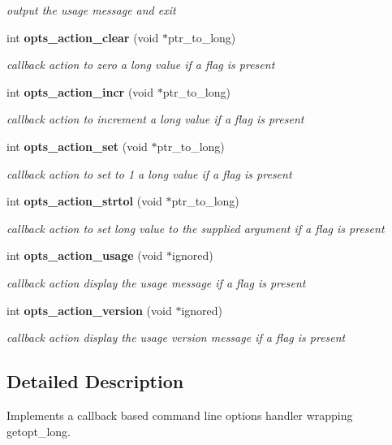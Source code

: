 \begin{CompactItemize}
\begin{CompactList}\small\item\em output the usage message and exit\item\end{CompactList}\item 
int {\bf opts\_\-action\_\-clear} (void $\ast$ptr\_\-to\_\-long)
\begin{CompactList}\small\item\em callback action to zero a long value if a flag is present\item\end{CompactList}\item 
int {\bf opts\_\-action\_\-incr} (void $\ast$ptr\_\-to\_\-long)
\begin{CompactList}\small\item\em callback action to increment a long value if a flag is present\item\end{CompactList}\item 
int {\bf opts\_\-action\_\-set} (void $\ast$ptr\_\-to\_\-long)
\begin{CompactList}\small\item\em callback action to set to 1 a long value if a flag is present\item\end{CompactList}\item 
int {\bf opts\_\-action\_\-strtol} (void $\ast$ptr\_\-to\_\-long)
\begin{CompactList}\small\item\em callback action to set long value to the supplied argument if a flag is present\item\end{CompactList}\item 
int {\bf opts\_\-action\_\-usage} (void $\ast$ignored)
\begin{CompactList}\small\item\em callback action display the usage message if a flag is present\item\end{CompactList}\item 
int {\bf opts\_\-action\_\-version} (void $\ast$ignored)
\begin{CompactList}\small\item\em callback action display the usage version message if a flag is present\item\end{CompactList}\end{CompactItemize}


\subsection{Detailed Description}
Implements a callback based command line options handler wrapping getopt\_\-long.



